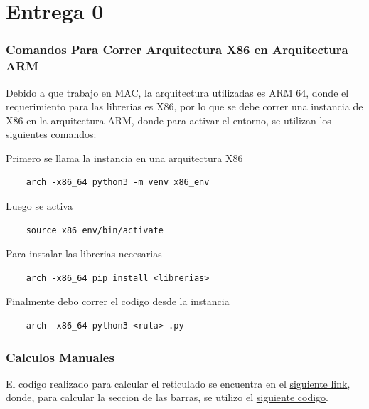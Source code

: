\part{Entrega 0}

\section{Comandos Para Correr Arquitectura X86 en Arquitectura ARM}

Debido a que trabajo en MAC, la arquitectura utilizadas es ARM 64, donde el requerimiento para las librerias es X86, por lo que se debe correr una instancia de X86 en la arquitectura ARM, donde para activar el entorno, se utilizan los siguientes comandos:

Primero se llama la instancia en una arquitectura X86

\begin{verbatim}
    arch -x86_64 python3 -m venv x86_env
\end{verbatim}

Luego se activa

\begin{verbatim}
    source x86_env/bin/activate
\end{verbatim}

Para instalar las librerias necesarias

\begin{verbatim}
    arch -x86_64 pip install <librerias>
\end{verbatim}

Finalmente debo correr el codigo desde la instancia

\begin{verbatim}
    arch -x86_64 python3 <ruta> .py
\end{verbatim}


    


\section{Calculos Manuales}

El codigo realizado para calcular el reticulado se encuentra en el \href{https://github.com/LukasWolff2002/PROYECTO_3_MCOC/blob/main/CODIGO/CODIGO_MANUAL/solucion_reticulado.py}{siguiente link}, donde, para calcular la seccion de las barras, se utilizo el \href{https://github.com/LukasWolff2002/PROYECTO_3_MCOC/blob/main/CODIGO/CODIGO_MANUAL/tipo_barras.py}{siguiente codigo}.

